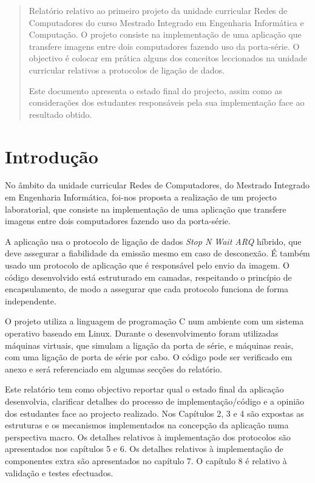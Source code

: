 \documentclass[11pt,a4paper,reqno]{report}
\numberwithin{equation}{section}
\begin{document}



\begin{abstract}
	
Relatório relativo ao primeiro projeto da unidade curricular Redes de Computadores do curso Mestrado Integrado em Engenharia Informática e Computação. O projeto consiste na implementação de uma aplicação que transfere imagens entre dois computadores fazendo uso da porta-série. O objectivo é colocar em prática alguns dos conceitos leccionados na unidade curricular relativos a protocolos de ligação de dados.

Este documento apresenta o estado final do projecto, assim como as considerações dos estudantes responsáveis pela sua implementação face ao resultado obtido.

\end{abstract}

\tableofcontents

\chapter{Introdução}

No âmbito da unidade curricular Redes de Computadores, do Mestrado Integrado em Engenharia Informática, foi-nos proposta a realização de um projecto laboratorial, que consiste na implementação de uma aplicação que transfere imagens entre dois computadores fazendo uso da porta-série. 

A aplicação usa o protocolo de ligação de dados \emph{Stop N Wait ARQ} híbrido, que deve assegurar a fiabilidade  da emissão mesmo em caso de desconexão. É também usado um protocolo de aplicação que é responsável pelo envio da imagem. O código desenvolvido está estruturado em camadas, respeitando o princípio de encapsulamento, de modo a assegurar que cada protocolo funciona de forma independente.
	
O projeto utiliza a linguagem de programação C num ambiente com um sistema operativo baseado em Linux. Durante o desenvolvimento foram utilizadas máquinas virtuais, que simulam a ligação da porta de série, e máquinas reais, com uma ligação de porta de série por cabo. O código pode ser verificado em anexo e será referenciado em algumas secções do relatório.
	
Este relatório tem como objectivo reportar qual o estado final da aplicação desenvolvia, clarificar detalhes do processo de implementação/código e a opinião dos estudantes face ao projecto realizado. Nos Capítulos 2, 3 e 4 são expostas as estruturas e os mecanismos implementados na concepção da aplicação numa perspectiva macro. Os detalhes relativos à implementação dos protocolos são apresentados nos capítulos 5 e 6. Os detalhes relativos à implementação de componentes extra são apresentados no capítulo 7. O capítulo 8 é relativo à validação e testes efectuados.
	
\end{document}
